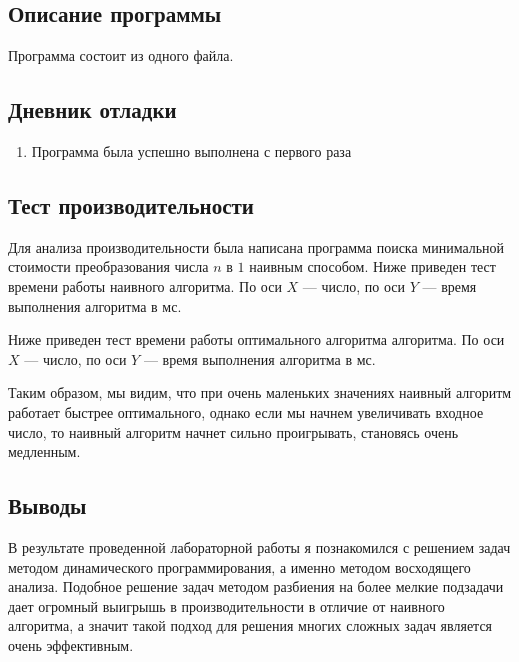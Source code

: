 \documentclass[12pt]{article}
\begin{document}
    \subsection*{Описание программы}

    Программа состоит из одного файла.

    \subsection*{Дневник отладки}

    \begin{enumerate}
    \item Программа была успешно выполнена с первого раза
    \end{enumerate}


    \subsection*{Тест производительности}
    Для анализа производительности была написана программа поиска минимальной стоимости преобразования числа $n$ в $1$ 
    наивным способом.
    Ниже приведен тест времени работы наивного алгоритма. По оси $X$ — число, 
    по оси $Y$ — время выполнения алгоритма в мс.
    

    Ниже приведен тест времени работы оптимального алгоритма алгоритма. По оси $X$ — число, 
    по оси $Y$ — время выполнения алгоритма в мс.
        Таким образом, мы видим, что при очень маленьких значениях наивный алгоритм работает быстрее оптимального, однако
        если мы начнем увеличивать входное число, то наивный алгоритм начнет сильно проигрывать, становясь очень медленным.

    \subsection*{Выводы}

    В результате проведенной лабораторной работы я познакомился с решением задач методом динамического программирования, а именно
    методом восходящего анализа. Подобное решение задач методом разбиения на более мелкие подзадачи дает огромный выигрышь в производительности
    в отличие от наивного алгоритма, а значит такой подход для решения многих сложных задач является очень эффективным.
\end{document}
